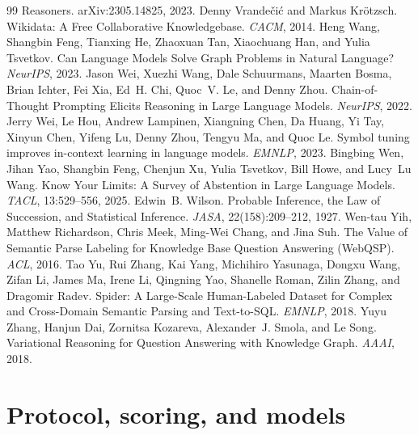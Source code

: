 \documentclass{article}
\begin{document}
\begin{thebibliography}{99}
Reasoners. arXiv:2305.14825, 2023.
Denny Vrande\v{c}i\'c and Markus Kr\"otzsch.
Wikidata: A Free Collaborative Knowledgebase.
\emph{CACM}, 2014.
Heng Wang, Shangbin Feng, Tianxing He, Zhaoxuan Tan, Xiaochuang Han, and
Yulia Tsvetkov.
Can Language Models Solve Graph Problems in Natural Language?
\emph{NeurIPS}, 2023.
Jason Wei, Xuezhi Wang, Dale Schuurmans, Maarten Bosma, Brian Ichter, Fei Xia,
Ed~H. Chi, Quoc~V. Le, and Denny Zhou.
Chain-of-Thought Prompting Elicits Reasoning in Large Language Models.
\emph{NeurIPS}, 2022.
Jerry Wei, Le Hou, Andrew Lampinen, Xiangning Chen, Da Huang, Yi Tay,
Xinyun Chen, Yifeng Lu, Denny Zhou, Tengyu Ma, and Quoc Le.
Symbol tuning improves in-context learning in language models.
\emph{EMNLP}, 2023.
Bingbing Wen, Jihan Yao, Shangbin Feng, Chenjun Xu, Yulia Tsvetkov, Bill Howe,
and Lucy~Lu Wang.
Know Your Limits: A Survey of Abstention in Large Language Models.
\emph{TACL}, 13:529--556, 2025.
Edwin~B. Wilson.
Probable Inference, the Law of Succession, and Statistical Inference.
\emph{JASA}, 22(158):209--212, 1927.
Wen-tau Yih, Matthew Richardson, Chris Meek, Ming-Wei Chang, and Jina Suh.
The Value of Semantic Parse Labeling for Knowledge Base Question Answering
({WebQSP}). \emph{ACL}, 2016.
Tao Yu, Rui Zhang, Kai Yang, Michihiro Yasunaga, Dongxu Wang, Zifan Li,
James Ma, Irene Li, Qingning Yao, Shanelle Roman, Zilin Zhang, and
Dragomir Radev.
Spider: A Large-Scale Human-Labeled Dataset for Complex and Cross-Domain
Semantic Parsing and Text-to-SQL. \emph{EMNLP}, 2018.
Yuyu Zhang, Hanjun Dai, Zornitsa Kozareva, Alexander~J. Smola, and Le Song.
Variational Reasoning for Question Answering with Knowledge Graph.
\emph{AAAI}, 2018.
\end{thebibliography}

\appendix
\FloatBarrier

\section{Protocol, scoring, and models}
\label{app:protocol}
\end{document}
